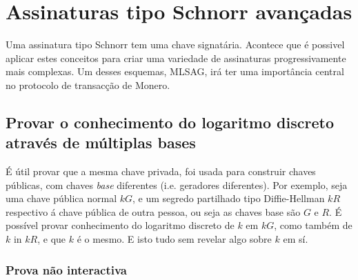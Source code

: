 \chapter{Assinaturas tipo Schnorr avançadas}
\label{chapter:advanced-schnorr}

Uma assinatura tipo Schnorr tem uma chave signatária. Acontece que é possivel aplicar estes conceitos para criar uma variedade de assinaturas progressivamente mais complexas. Um desses esquemas, MLSAG, irá ter uma importância central no protocolo de transacção de Monero.


\section{Provar o conhecimento do logaritmo discreto através de múltiplas bases}
\label{sec:proofs-discrete-logarithm-multiple-bases}

É útil provar que a mesma chave privada, foi usada para construir chaves públicas, com chaves {\em base} diferentes (i.e. geradores diferentes). Por exemplo, seja uma chave pública normal $k G$, e um segredo partilhado tipo Diffie-Hellman $k R$ respectivo á chave pública de outra pessoa, ou seja as chaves base são $G$ e $R$. É possível provar conhecimento do logaritmo discreto de $k$ em $k G$, como também de $k$ in $k R$, e que $k$ é o mesmo. E isto tudo sem revelar algo sobre $k$ em sí. 



\subsection*{Prova não interactiva}

